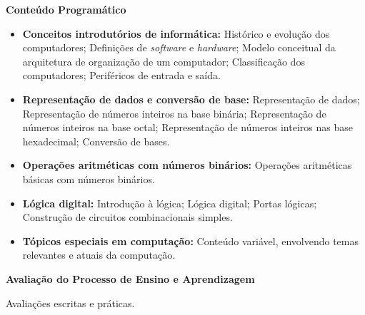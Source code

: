 
\begin{snugshade}\begin{center}\textbf{
    Conteúdo Programático
}\end{center}\end{snugshade}

\begin{itemize}

 \item \textbf{Conceitos introdut\'orios de inform\'atica:} Histórico e evolução dos computadores; Defini\c{c}\~oes de \textit{software} e \textit{hardware}; Modelo conceitual da arquitetura de organiza\c{c}\~ao de um computador; Classifica\c{c}\~ao dos computadores; Perif\'ericos de entrada e sa\'ida.

 \item \textbf{Representa\c{c}\~ao de dados e convers\~ao de base:} Representação de dados; Representação de números inteiros na base binária; Representação de números inteiros na base octal; Representação de números inteiros nas base hexadecimal; Convers\~ao de bases.

 \item \textbf{Opera\c{c}\~oes aritm\'eticas com n\'umeros bin\'arios:} Opera\c{c}\~oes aritm\'eticas b\'asicas com n\'umeros bin\'arios.

 \item \textbf{L\'ogica digital:} Introdu\c{c}\~ao \`a l\'ogica; L\'ogica digital; Portas l\'ogicas; Constru\c{c}\~ao de circuitos combinacionais simples.

 \item \textbf{T\'opicos especiais em computa\c{c}\~ao:} Conte\'udo vari\'avel, envolvendo temas relevantes e atuais da computa\c{c}\~ao.

\end{itemize}



\begin{snugshade}\begin{center}\textbf{
    Avaliação do Processo de Ensino e Aprendizagem
}\end{center}\end{snugshade}

\noindent
          Avaliações escritas e pr\'aticas.




